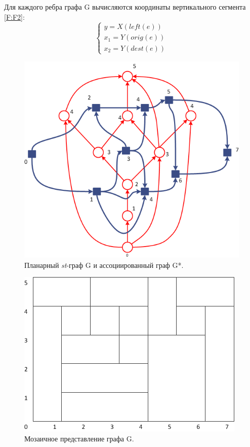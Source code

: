 Для каждого ребра графа G вычисляются координаты вертикального сегмента \ref{F:F2}:
\begin{equation}
	\begin{cases}
	y = X(left(e)) \\
	x_{1} = Y(orig(e)) \\
	x_{2} = Y(dest(e))
	\end{cases}
\label{F:F2}
\end{equation}

\begin{figure}
	\begin{center}
		\includegraphics[scale=1]{include/Graph.png}
	\end{center}
	\caption{Планарный \textit{st}-граф G и ассоциированный граф G*.}
	\label{fig:fig14}
\end{figure}

\begin{figure}
	\begin{center}
		\includegraphics[scale=1]{include/MosaicView.png}
	\end{center}
	\caption{Мозаичное представление графа G.}
	\label{fig:fig15}
\end{figure}

